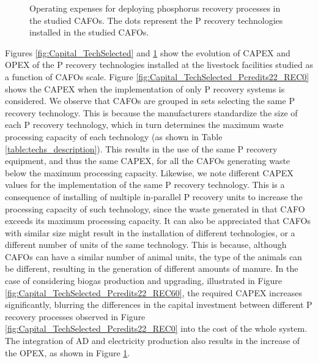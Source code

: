 \begin{refsection}[referencesCh4]
\begin{figure}[h]
	\caption{Operating expenses for deploying phosphorus recovery processes in the studied CAFOs. The dots represent the P recovery technologies installed in the studied CAFOs.}
	\label{fig:OPEX_TechSelected}
\end{figure}

Figures \ref{fig:Capital_TechSelected} and \ref{fig:OPEX_TechSelected} show the evolution of CAPEX and OPEX of the P recovery technologies installed at the livestock facilities studied as a function of CAFOs scale. Figure \ref{fig:Capital_TechSelected_Pcredits22_REC0} shows the CAPEX when the implementation of only P recovery systems is considered. We observe that CAFOs are grouped in sets selecting the same P recovery technology. This is because the manufacturers standardize the size of each P recovery technology, which in turn determines the maximum waste processing capacity of each technology (as shown in Table \ref{table:techs_description}). This results in the use of the same P recovery equipment, and thus the same CAPEX, for all the CAFOs generating waste below the maximum processing capacity. Likewise, we note different CAPEX values for the implementation of the same P recovery technology. This is a consequence of installing of multiple in-parallel P recovery units to increase the processing capacity of such technology, since the waste generated in that CAFO exceeds its maximum processing capacity. It can also be appreciated that CAFOs with similar size might result in the installation of different technologies, or a different number of units of the same technology.
This is because, although CAFOs can have a similar number of animal units, the type of the animals can be different, resulting in the generation of different amounts of manure. 
In the case of considering biogas production and upgrading, illustrated in Figure \ref{fig:Capital_TechSelected_Pcredits22_REC60}, the required CAPEX increases significantly, blurring the differences in the capital investment between different P recovery processes observed in Figure \ref{fig:Capital_TechSelected_Pcredits22_REC0} into the cost of the whole system. The integration of AD and electricity production also results in the increase of the OPEX, as shown in Figure \ref{fig:OPEX_TechSelected}.


\end{refsection}
